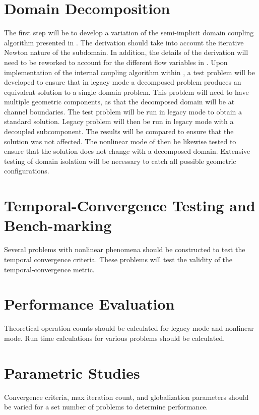 \section{Domain Decomposition}
\label{sect:domain_coupling}
The first step will be to develop a variation of the semi-implicit domain coupling algorithm presented in .
The derivation should take into account the iterative Newton nature of the subdomain. 
In addition, the details of the derivation will need to be reworked to account for the different flow variables in \cobra{}.
Upon implementation of the internal coupling algorithm within \cobra{}, a test problem will be developed to ensure that in legacy mode a decomposed problem produces an equivalent solution to a single domain problem.
This problem will need to have multiple geometric components, as that the decomposed domain will be at channel boundaries.
The test problem will be run in legacy mode to obtain a standard solution.
Legacy problem will then be run in legacy mode with a decoupled subcomponent.
The results will be compared to ensure that the solution was not affected.
The nonlinear mode of \cobra{} then be likewise tested to ensure that the solution does not change with a decomposed domain.
Extensive testing of domain isolation will be necessary to catch all possible geometric configurations.

\section{Temporal-Convergence Testing and Bench-marking}
\label{sect:proposal_temporal_testing}
Several problems with nonlinear phenomena should be constructed to test the temporal convergence criteria.
These problems will test the validity of the temporal-convergence metric.

\section{Performance Evaluation}
\label{sect:proposal_performance_evaluation}
Theoretical operation counts should be calculated for legacy mode and nonlinear mode.
Run time calculations for various problems should be calculated.


\section{Parametric Studies}
\label{sect:proposal_parametric_studies}
Convergence criteria, max iteration count, and globalization parameters should be varied for a set number of problems to determine performance.

